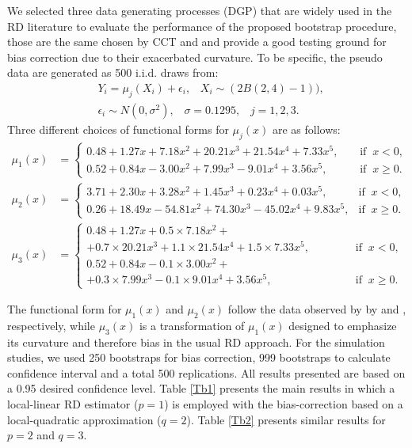 \documentclass[12pt,fleqn]{article}
\begin{document}
We selected three data generating processes (DGP) that are widely used in the RD
literature to evaluate the performance of the proposed bootstrap procedure, 
those are the same chosen by CCT and \cite{IK} and provide a 
good testing ground for bias correction due to their exacerbated curvature. 
To be specific, the pseudo data are generated as 500 i.i.d. draws from:
\begin{align*}
& Y_{i} = \mu_{j}(X_{i}) + \epsilon_{i}, \;\;\; X_{i} \sim  (2 B (2,4) - 1)), \\
& \epsilon_{i} \sim N(0, \sigma^{2}), \;\;\; \sigma = 0.1295, \;\;\; j = 1,2,3.
\end{align*}
Three different choices of functional forms for $\mu_{j}(x)$ are as follows:
\begin{align}
\mu_{1}(x) & = 
\begin{cases}
0.48 + 1.27x + 7.18x^{2} + 20.21x^{3} + 21.54x^{4} + 7.33x^{5}, \;\;\;\; & \text{if} \;\; x < 0, \\
0.52 + 0.84x - 3.00x^{2} + 7.99x^3 - 9.01x^4 + 3.56x^{5},  & \text{if} \;\; x \ge 0.
\end{cases}
\\
\mu_{2}(x) & = 
\begin{cases}
3.71 + 2.30x + 3.28x^2 + 1.45x^3 + 0.23x^4 + 0.03x^5, \;\; & \text{if} \;\; x < 0, \\
0.26 + 18.49x - 54.81x^2 + 74.30x^3 - 45.02x^4 + 9.83x^5,  & \text{if} \;\; x \ge 0.
\end{cases}
\\
\mu_{3}(x) & =
\begin{cases}
0.48 + 1.27x + 0.5 \times 7.18x^{2}+ \\
+ 0.7 \times 20.21x^3 + 1.1 \times 21.54x^4 + 1.5 \times 7.33x^5, \;\;\;\;\;\;\;\;\;\;\;\; & \text{if} \;\; x < 0, \\
0.52 + 0.84x - 0.1 \times 3.00x^{2}+ \\
+ 0.3 \times 7.99x^3 - 0.1 \times 9.01x^4 + 3.56x^5, & \text{if} \;\; x \ge 0.
\end{cases}
\end{align}

The functional form for $\mu_{1}(x)$ and $\mu_{2}(x)$ follow the data observed 
by by\cite{lee2008} and \cite{ludwig2007}, respectively, while $\mu_{3}(x)$ is
a transformation of $\mu_{1}(x)$ designed to emphasize its curvature and 
therefore bias in the usual RD approach. For the simulation studies, we used 
250 bootstraps for bias correction, 999 bootstraps to calculate confidence 
interval and a total 500 replications. All results presented are based on a 
0.95 desired confidence level. Table \ref{Tb1} presents the main results in which
a local-linear RD estimator ($p=1$) is employed with the bias-correction based 
on a local-quadratic approximation ($q=2$). Table \ref{Tb2} presents similar 
results for $p=2$ and $q=3$.
\end{document}
